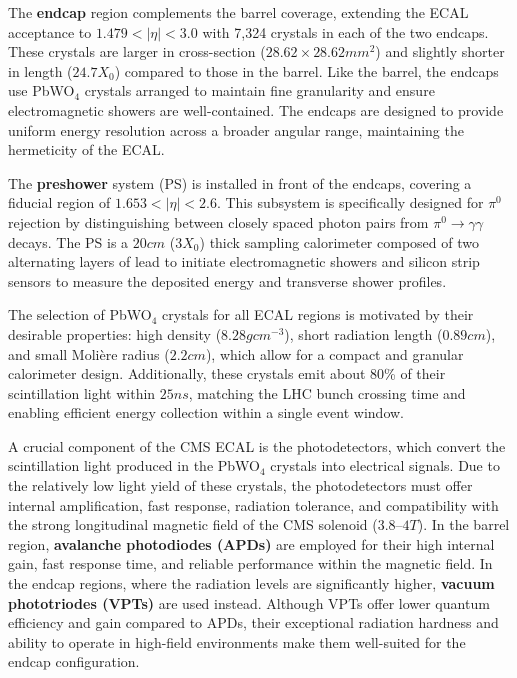 The \textbf{endcap} region complements the barrel coverage, extending the ECAL acceptance to $1.479 < |\eta| < 3.0$ with 7,324 crystals in each of the two endcaps. These crystals are larger in cross-section ($28.62 \times 28.62\unit{mm}^2$) and slightly shorter in length ($24.7 X_0$) compared to those in the barrel. Like the barrel, the endcaps use PbWO$_4$ crystals arranged to maintain fine granularity and ensure electromagnetic showers are well-contained. The endcaps are designed to provide uniform energy resolution across a broader angular range, maintaining the hermeticity of the ECAL.

The \textbf{preshower} system (PS) is installed in front of the endcaps, covering a fiducial region of $1.653 < |\eta| < 2.6$. This subsystem is specifically designed for $\pi^0$ rejection by distinguishing between closely spaced photon pairs from $\pi^0 \to \gamma \gamma$ decays. The PS is a $20\unit{cm}$ ($3X_0$) thick sampling calorimeter composed of two alternating layers of lead to initiate electromagnetic showers and silicon strip sensors to measure the deposited energy and transverse shower profiles.

The selection of PbWO$_4$ crystals for all ECAL regions is motivated by their desirable properties: high density ($8.28\unit{gcm}^{-3}$), short radiation length ($0.89\unit{cm}$), and small Moli\`ere radius ($2.2\unit{cm}$), which allow for a compact and granular calorimeter design. Additionally, these crystals emit about 80\% of their scintillation light within $25\unit{ns}$, matching the LHC bunch crossing time and enabling efficient energy collection within a single event window.

A crucial component of the CMS ECAL is the photodetectors, which convert the scintillation light produced in the PbWO$_4$ crystals into electrical signals. Due to the relatively low light yield of these crystals, the photodetectors must offer internal amplification, fast response, radiation tolerance, and compatibility with the strong longitudinal magnetic field of the CMS solenoid ($3.8$--$4\unit{T}$). In the barrel region, \textbf{avalanche photodiodes (APDs)} are employed for their high internal gain, fast response time, and reliable performance within the magnetic field. In the endcap regions, where the radiation levels are significantly higher, \textbf{vacuum phototriodes (VPTs)} are used instead. Although VPTs offer lower quantum efficiency and gain compared to APDs, their exceptional radiation hardness and ability to operate in high-field environments make them well-suited for the endcap configuration.

